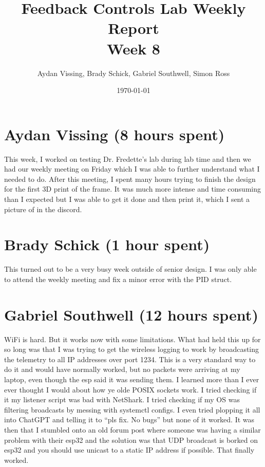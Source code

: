 \documentclass[12pt, titlepage]{article}
\title{Feedback Controls Lab Weekly Report \\ \normalsize{Week 8}}
\author{Aydan Vissing, Brady Schick, Gabriel Southwell, Simon Ross}
\date{\today}
\begin{document}
\maketitle

\section*{Aydan Vissing (8 hours spent)}

This week, I worked on testing Dr. Fredette's lab during lab time and then we had our weekly meeting on Friday which I was able to further understand what I needed to do. After this meeting, I spent many hours trying to finish the design for the first 3D print of the frame. It was much more intense and time consuming than I expected but I was able to get it done and then print it, which I sent a picture of in the discord. 

\section*{Brady Schick (1 hour spent)}

This turned out to be a very busy week outside of senior design. I was only able to attend the weekly meeting and fix a minor error with the PID struct.

\section*{Gabriel Southwell (12 hours spent)}

WiFi is hard. But it works now with some limitations. What had held this up for so long was that I was trying to get the wireless logging to work by broadcasting the telemetry to all IP addresses over port 1234. This is a very standard way to do it and would have normally worked, but no packets were arriving at my laptop, even though the esp said it was sending them. I learned more than I ever ever thought I would about how ye olde POSIX sockets work. I tried checking if it my listener script was bad with NetShark. I tried checking if my OS was filtering broadcasts by messing with systemctl configs. I even tried plopping it all into ChatGPT and telling it to “pls fix. No bugs” but none of it worked. It was then that I stumbled onto an old forum post where someone was having a similar problem with their esp32 and the solution was that UDP broadcast is borked on esp32 and you should use unicast to a static IP address if possible. That finally worked.
\end{document}
